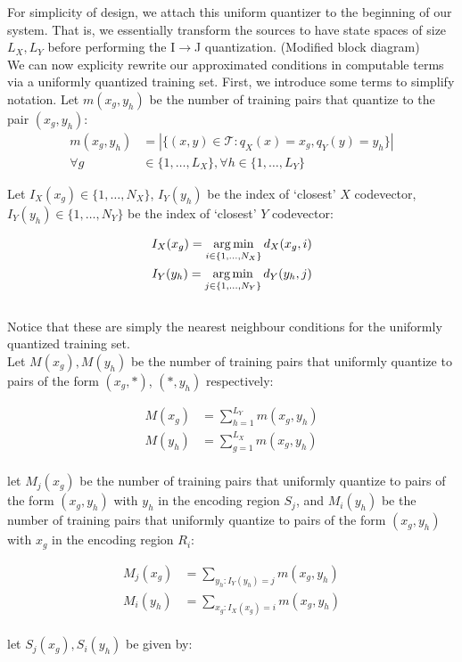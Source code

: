 For simplicity of design, we attach this uniform quantizer to the beginning of our system. That is, we essentially transform the sources to have state spaces of size $L_X, L_Y$ before performing the I$\rightarrow$J quantization. (Modified block diagram)\\

We can now explicity rewrite our approximated conditions in computable terms via a uniformly quantized training set. First, we introduce some terms to simplify notation. Let $m(x_g, y_h)$ be the number of training pairs that quantize to the pair $(x_g,y_h)$:\\

\begin{align}
    m(x_g, y_h)&=|\{(x,y) \in \mathcal{T} : q_X(x) = x_g, q_Y(y) = y_h\}|\\
    \forall g&\in \{1,\ldots,L_X\}, \forall h\in \{1,\ldots,L_Y\}\nonumber
\end{align}

Let $I_X(x_g)\in\{1,\ldots,N_X\}$, $I_Y(y_h)$ be the index of `closest' $X$ codevector, $I_Y(y_h)\in\{1,\ldots,N_Y\}$ be the index of `closest' $Y$ codevector:

\begin{align}
    \label{eq:I_X}
    I_X(x_g)=\operatorname*{arg\,min}_{i \in \{1,\dots,N_X\}}d_X(x_g,i)\\
    \label{eq:I_Y}
    I_Y(y_h)=\operatorname*{arg\,min}_{j \in \{1,\dots,N_Y\}}d_Y(y_h,j)
\end{align}
\\
Notice that these are simply the nearest neighbour conditions for the uniformly quantized training set.\\

Let $M(x_g), M(y_h)$ be the number of training pairs that uniformly quantize to pairs of the form $(x_g, *)$, $(*, y_h)$ respectively:

\begin{align}
    M(x_g) &= {\sum_{h=1}^{L_Y}m(x_g,y_h)}\\
    M(y_h) &= {\sum_{g=1}^{L_X}m(x_g,y_h)}
\end{align}
\\
let $M_j(x_g)$ be the number of training pairs that uniformly quantize to pairs of the form $(x_g, y_h)$ with $y_h$ in the encoding region $S_j$, and $M_i(y_h)$ be the number of training pairs that uniformly quantize to pairs of the form $(x_g, y_h)$ with $x_g$ in the encoding region $R_i$:

\begin{align}
    M_j(x_g) &= \sum_{y_h:I_Y(y_h)=j}m(x_g,y_h) \\
    M_i(y_h) &= \sum_{x_g:I_X(x_g)=i}m(x_g,y_h)
\end{align}
\\
let $S_j(x_g), S_i(y_h)$ be given by:

